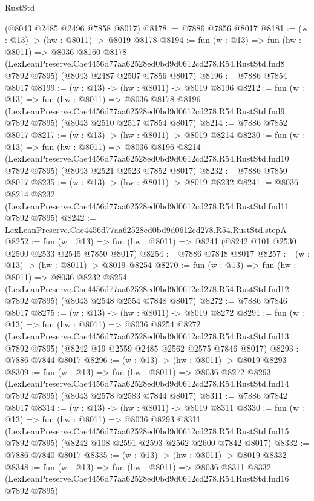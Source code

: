 \begin{lexlean}{RustStd}
\begin{coremodule}
    (@8043 @2485 @2496 @7858 @8017)
@8178 := @7886 @7856 @8017
@8181 := (w : @13) -> (hw : @8011) -> @8019 @8178
@8194 := fun (w : @13) =>
  fun (hw : @8011) =>
  @8036
    @8160
    @8178
    (LexLeanPreserve.Cae4456d77aa62528ed0bd9d0612cd278.R54.RustStd.fnd8 @7892 @7895)
    (@8043 @2487 @2507 @7856 @8017)
@8196 := @7886 @7854 @8017
@8199 := (w : @13) -> (hw : @8011) -> @8019 @8196
@8212 := fun (w : @13) =>
  fun (hw : @8011) =>
  @8036
    @8178
    @8196
    (LexLeanPreserve.Cae4456d77aa62528ed0bd9d0612cd278.R54.RustStd.fnd9 @7892 @7895)
    (@8043 @2510 @2517 @7854 @8017)
@8214 := @7886 @7852 @8017
@8217 := (w : @13) -> (hw : @8011) -> @8019 @8214
@8230 := fun (w : @13) =>
  fun (hw : @8011) =>
  @8036
    @8196
    @8214
    (LexLeanPreserve.Cae4456d77aa62528ed0bd9d0612cd278.R54.RustStd.fnd10 @7892 @7895)
    (@8043 @2521 @2523 @7852 @8017)
@8232 := @7886 @7850 @8017
@8235 := (w : @13) -> (hw : @8011) -> @8019 @8232
@8241 := @8036
    @8214
    @8232
    (LexLeanPreserve.Cae4456d77aa62528ed0bd9d0612cd278.R54.RustStd.fnd11 @7892 @7895)
@8242 := LexLeanPreserve.Cae4456d77aa62528ed0bd9d0612cd278.R54.RustStd.stepA
@8252 := fun (w : @13) => fun (hw : @8011) => @8241 (@8242 @101 @2530 @2500 @2533 @2545 @7850 @8017)
@8254 := @7886 @7848 @8017
@8257 := (w : @13) -> (hw : @8011) -> @8019 @8254
@8270 := fun (w : @13) =>
  fun (hw : @8011) =>
  @8036
    @8232
    @8254
    (LexLeanPreserve.Cae4456d77aa62528ed0bd9d0612cd278.R54.RustStd.fnd12 @7892 @7895)
    (@8043 @2548 @2554 @7848 @8017)
@8272 := @7886 @7846 @8017
@8275 := (w : @13) -> (hw : @8011) -> @8019 @8272
@8291 := fun (w : @13) =>
  fun (hw : @8011) =>
  @8036
    @8254
    @8272
    (LexLeanPreserve.Cae4456d77aa62528ed0bd9d0612cd278.R54.RustStd.fnd13 @7892 @7895)
    (@8242 @19 @2559 @2485 @2562 @2575 @7846 @8017)
@8293 := @7886 @7844 @8017
@8296 := (w : @13) -> (hw : @8011) -> @8019 @8293
@8309 := fun (w : @13) =>
  fun (hw : @8011) =>
  @8036
    @8272
    @8293
    (LexLeanPreserve.Cae4456d77aa62528ed0bd9d0612cd278.R54.RustStd.fnd14 @7892 @7895)
    (@8043 @2578 @2583 @7844 @8017)
@8311 := @7886 @7842 @8017
@8314 := (w : @13) -> (hw : @8011) -> @8019 @8311
@8330 := fun (w : @13) =>
  fun (hw : @8011) =>
  @8036
    @8293
    @8311
    (LexLeanPreserve.Cae4456d77aa62528ed0bd9d0612cd278.R54.RustStd.fnd15 @7892 @7895)
    (@8242 @108 @2591 @2593 @2562 @2600 @7842 @8017)
@8332 := @7886 @7840 @8017
@8335 := (w : @13) -> (hw : @8011) -> @8019 @8332
@8348 := fun (w : @13) =>
  fun (hw : @8011) =>
  @8036
    @8311
    @8332
    (LexLeanPreserve.Cae4456d77aa62528ed0bd9d0612cd278.R54.RustStd.fnd16 @7892 @7895)

\end{coremodule}
\end{lexlean}
